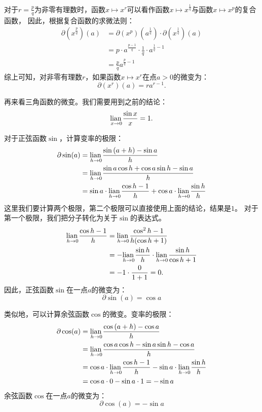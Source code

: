 \documentclass[12pt,UTF8]{ctexbook}
\begin{document}
对于$r = \frac{p}{q}$为非零有理数时，函数$x \mapsto x^r$可以看作函数$x \mapsto x^{\frac{1}{q}}$与函数$x \mapsto x^{p}$的复合函数，
因此，根据复合函数的求微法则：
\begin{align*}
    \partial (x^{\frac{p}{q}}) (a) &= \partial (x^p) (a^{\frac{1}{q}}) \cdot \partial (x^{\frac{1}{q}}) (a)  \\
    &= p \cdot a^{\frac{p - 1}{q}} \cdot \frac{1}{q} \cdot a^{\frac{1}{q} - 1}  \\
    &= \frac{p}{q} a^{\frac{p}{q} - 1}     
\end{align*}
综上可知，对非零有理数$r$，如果函数$x \mapsto x^r$在点$a>0$的微变为：
$$ \partial (x^r) (a) = r a^{r-1}. $$

再来看三角函数的微变。我们需要用到之前的结论：
$$ \underset{x\to 0}{\operatorname{lian}\,} \frac{\sin{x}}{x} = 1.$$

对于正弦函数$\sin$，计算变率的极限：
\begin{align*}
    \partial \sin(a) &= \underset{h\to 0}{\operatorname{lian}\,} \frac{\sin{(a + h)} - \sin{a}}{h}  \\
    &= \underset{h\to 0}{\operatorname{lian}\,} \frac{\sin{a}\cos{h} + \cos{a}\sin{h} - \sin{a}}{h}  \\
    &= \sin{a} \cdot \underset{h\to 0}{\operatorname{lian}\,} \frac{\cos{h} - 1}{h} + \cos{a} \cdot \underset{h\to 0}{\operatorname{lian}\,}\frac{\sin{h}}{h} 
\end{align*}
这里我们要计算两个极限，第二个极限可以直接使用上面的结论，结果是$1$。
对于第一个极限，我们把分子转化为关于$\sin$的表达式。
\begin{align*}
    \underset{h\to 0}{\operatorname{lian}\,} \frac{\cos{h} - 1}{h} &= \underset{h\to 0}{\operatorname{lian}\,} \frac{\cos^2{h} - 1}{h(\cos{h} + 1)}  \\
    &= -\underset{h\to 0}{\operatorname{lian}\,} \frac{\sin{h}}{h} \cdot \underset{h\to 0}{\operatorname{lian}\,} \frac{\sin{h}}{\cos{h} + 1}  \\
    &= -1 \cdot \frac{0}{1 + 1} = 0.  
\end{align*}
因此，正弦函数$\sin$在一点$a$的微变为：
$$ \partial \sin(a) = \cos{a} $$

类似地，可以计算余弦函数$\cos$的微变。变率的极限：
\begin{align*}
    \partial \cos(a) &= \underset{h\to 0}{\operatorname{lian}\,} \frac{\cos{(a + h)} - \cos{a}}{h}  \\
    &= \underset{h\to 0}{\operatorname{lian}\,} \frac{\cos{a}\cos{h} - \sin{a}\sin{h} - \cos{a}}{h}  \\
    &= \cos{a} \cdot \underset{h\to 0}{\operatorname{lian}\,} \frac{\cos{h} - 1}{h} - \sin{a} \cdot\underset{h\to 0}{\operatorname{lian}\,}\frac{\sin{h}}{h}  \\
    &= \cos{a} \cdot 0 - \sin{a} \cdot 1 = -\sin{a} 
\end{align*}
余弦函数$\cos$在一点$a$的微变为：
$$ \partial \cos(a) = -\sin{a} $$
\end{document}
